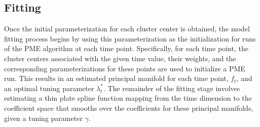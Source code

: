 \documentclass[11pt,reqno]{article}
\theoremstyle{definition}
\begin{document}
\subsection*{Fitting}
Once the initial parameterization for each cluster center is obtained, the model fitting process begins by using this parameterization as the initialization for runs of the PME algorithm at each time point. Specifically, for each time point, the cluster centers associated with the given time value, their weights, and the corresponding parameterizations for these points are used to initialize a PME run. This results in an estimated principal manifold for each time point, $f_t$, and an optimal tuning parameter $\lambda_t^*$. The remainder of the fitting stage involves estimating a thin plate spline function mapping from the time dimension to the coefficient space that smooths over the coefficients for these principal manifolds, given a tuning parameter $\gamma$.
\end{document}
